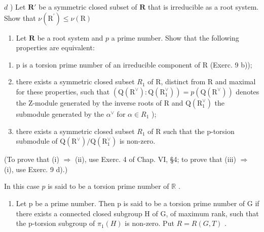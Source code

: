 \begin{enumerate}
\(d\) ) Let \(\mathbf{R}'\) be a symmetric closed subset of \(\mathbf{R}\) that is irreducible as a root system. Show that \(\nu (\mathrm{R}^{\prime})\leq \nu (\mathrm{R})\)

\begin{enumerate}
\def\labelenumi{\arabic{enumi})}
\setcounter{enumi}{9}
\tightlist
\item
  Let \(\mathbf{R}\) be a root system and \(p\) a prime number. Show that the following properties are equivalent:
\end{enumerate}

\begin{enumerate}
\def\labelenumi{(\roman{enumi})}
\item
  p is a torsion prime number of an irreducible component of R (Exerc. 9 b));\\
\item
  there exists a symmetric closed subset \(R_{1}\) of R, distinct from R and maximal for these properties, such that \((\mathrm{Q}(\mathrm{R}^{\vee}):\mathrm{Q}(\mathrm{R}_{1}^{\vee}))=p(\mathrm{Q}(\mathrm{R}^{\vee}))\) denotes the Z-module generated by the inverse roots of R and \(\mathrm{Q}(\mathrm{R}_{1}^{\vee})\) the submodule generated by the \(\alpha^{\vee}\) for \(\alpha\in R_{1}\) );
\item
  there exists a symmetric closed subset \(R_{1}\) of R such that the p-torsion submodule of \(\mathrm{Q}(\mathrm{R}^{\vee})/\mathrm{Q}(\mathrm{R}_{1}^{\vee})\) is non-zero.
\end{enumerate}

(To prove that (i) \(\Longrightarrow\) (ii), use Exerc. 4 of Chap. VI, §4; to prove that (iii) \(\Longrightarrow\) (i), use Exerc. 9 d).)

In this case \(p\) is said to be a torsion prime number of \(\mathbb{R}\) .

\begin{enumerate}
\def\labelenumi{\arabic{enumi})}
\setcounter{enumi}{10}
\tightlist
\item
  Let p be a prime number. Then p is said to be a torsion prime number of G if there exists a connected closed subgroup H of G, of maximum rank, such that the p-torsion subgroup of \(\pi_{1}(H)\) is non-zero. Put \(R = R(G, T)\) .
\end{enumerate}


\end{enumerate}
